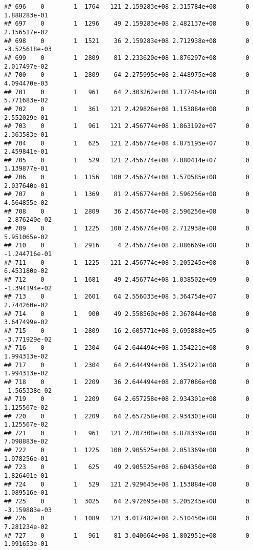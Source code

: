\documentclass[
]{article}
\begin{document}
\begin{enumerate}
\begin{verbatim}
## 696    0        1  1764   121 2.159283e+08 2.315784e+08        0  1.888283e-01
## 697    0        1  1296    49 2.159283e+08 2.482137e+08        0  2.156517e-02
## 698    0        1  1521    36 2.159283e+08 2.712938e+08        0 -3.525618e-03
## 699    0        1  2809    81 2.233620e+08 1.876297e+08        0  2.017497e-02
## 700    0        1  2809    64 2.275995e+08 2.448975e+08        0  4.094470e-03
## 701    0        1   961    64 2.303262e+08 1.177464e+08        0  5.771683e-02
## 702    0        1   361   121 2.429826e+08 1.153884e+08        0  2.552029e-01
## 703    0        1   961   121 2.456774e+08 1.863192e+07        0  2.363583e-01
## 704    0        1   625   121 2.456774e+08 4.875195e+07        0  2.459841e-01
## 705    0        1   529   121 2.456774e+08 7.080414e+07        0  1.139877e-01
## 706    0        1  1156   100 2.456774e+08 1.570585e+08        0  2.037640e-01
## 707    0        1  1369    81 2.456774e+08 2.596256e+08        0  4.564855e-02
## 708    0        1  2809    36 2.456774e+08 2.596256e+08        0 -2.876240e-02
## 709    0        1  1225   100 2.456774e+08 2.712938e+08        0  5.951065e-02
## 710    0        1  2916     4 2.456774e+08 2.886669e+08        0 -1.244716e-01
## 711    0        1  1225   121 2.456774e+08 3.205245e+08        0  6.453180e-02
## 712    0        1  1681    49 2.456774e+08 1.038502e+09        0 -1.394194e-02
## 713    0        1  2601    64 2.556033e+08 3.364754e+07        0  2.744260e-02
## 714    0        1   900    49 2.558560e+08 2.367844e+08        0  3.647499e-02
## 715    0        1  2809    16 2.605771e+08 9.695888e+05        0 -3.771929e-02
## 716    0        1  2304    64 2.644494e+08 1.354221e+08        0  1.994313e-02
## 717    0        1  2304    64 2.644494e+08 1.354221e+08        0  1.994313e-02
## 718    0        1  2209    36 2.644494e+08 2.077086e+08        0 -1.565338e-02
## 719    0        1  2209    64 2.657258e+08 2.934301e+08        0  1.125567e-02
## 720    0        1  2209    64 2.657258e+08 2.934301e+08        0  1.125567e-02
## 721    0        1   961   121 2.707308e+08 3.878339e+08        0  7.098883e-02
## 722    0        1  1225   100 2.905525e+08 2.051369e+08        0  1.978256e-01
## 723    0        1   625    49 2.905525e+08 2.604350e+08        0  1.826401e-01
## 724    0        1   529   121 2.929643e+08 1.153884e+08        0  1.089516e-01
## 725    0        1  3025    64 2.972693e+08 3.205245e+08        0 -3.159883e-03
## 726    0        1  1089   121 3.017482e+08 2.510450e+08        0  7.281234e-02
## 727    0        1   961    81 3.040664e+08 1.802951e+08        0  1.991653e-01

\end{verbatim}
\end{enumerate}
\end{document}
